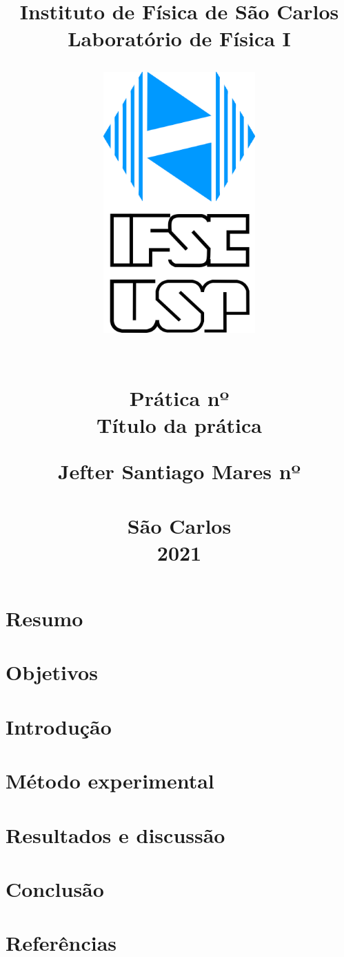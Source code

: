 \documentclass[a4paper, 12pt]{article}
\title{
   \begin{center}
        \Huge{
        \textbf{Instituto de Física de São Carlos \\
        Laboratório de Física I}
        \vspace{1em}
        \begin{figure}[h]
  \begin{center}
      \includegraphics[width=6cm, height=10cm]{ifsc-logo.jpg}
   \end{center}
\end{figure}
       \vspace{0.5em} \\
        \Large{Prática nº}
        \vspace{0.5em} \\
       \large{ Título da prática}
        }
        \vspace*{\fill}
        \large{
        Jefter Santiago Mares nº \\
        }
        \vspace*{\fill}
      \\São Carlos \\  2021
\newpage
\end{center}}
\date{}
\begin{document}
\maketitle
\section{Resumo}
\section{Objetivos}
\section{Introdução}
\section{Método experimental}
\section{Resultados e discussão}
\section{Conclusão}
\section{Referências}
\end{document}
